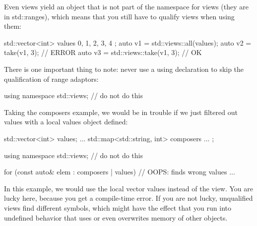 Even views yield an object that is not part of the namespace for views (they are in std::ranges), which means that you still have to qualify views when using them:

\begin{cpp}
std::vector<int> values{ 0, 1, 2, 3, 4 };
auto v1 = std::views::all(values);
auto v2 = take(v1, 3); // ERROR
auto v3 = std::views::take(v1, 3); // OK
\end{cpp}

There is one important thing to note: never use a using declaration to skip the qualification of range adaptors:

\begin{cpp}
using namespace std::views; // do not do this
\end{cpp}

Taking the composers example, we would be in trouble if we just filtered out values with a local values object defined:

\begin{cpp}
std::vector<int> values;
...
std::map<std::string, int> composers{ ... };

using namespace std::views; // do not do this

for (const auto& elem : composers | values) { // OOPS: finds wrong values
	...
}
\end{cpp}

In this example, we would use the local vector values instead of the view. You are lucky here, because you get a compile-time error. If you are not lucky, unqualified views find different symbols, which might have the effect that you run into undefined behavior that uses or even overwrites memory of other objects.
